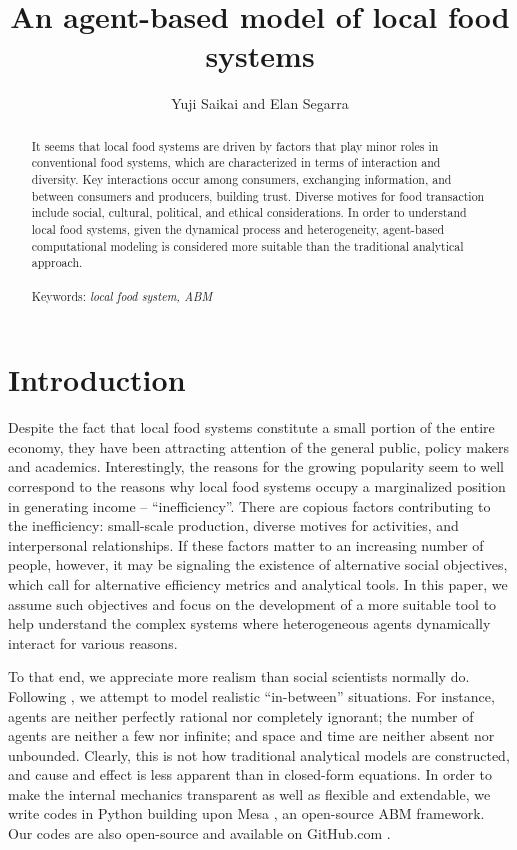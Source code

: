 \documentclass[11pt, oneside]{article}
\title{An agent-based model of local food systems}
\author{Yuji Saikai and Elan Segarra}
\begin{document}
\maketitle
\thispagestyle{empty} %
\vspace{5mm}

\begin{abstract}
\noindent 
It seems that local food systems are driven by factors that play minor roles in conventional food systems, which are characterized in terms of interaction and diversity. Key interactions occur among consumers, exchanging information, and between consumers and producers, building trust. Diverse motives for food transaction include social, cultural, political, and ethical considerations. In order to understand local food systems, given the dynamical process and heterogeneity, agent-based computational modeling is considered more suitable than the traditional analytical approach.\\\\
\noindent
Keywords: \textit{local food system, ABM}
\end{abstract}

\pagebreak

\tableofcontents
\pagebreak

\section{Introduction}
Despite the fact that local food systems constitute a small portion of the entire economy, they have been attracting  attention of the general public, policy makers and academics. Interestingly, the reasons for the growing popularity seem to well correspond to the reasons why local food systems occupy a marginalized position in generating income -- ``inefficiency''. There are copious factors contributing to the inefficiency: small-scale production, diverse motives for activities, and interpersonal relationships. If these factors matter to an increasing number of people, however, it may be signaling the existence of alternative social objectives, which call for alternative efficiency metrics and analytical tools. In this paper, we assume such objectives and focus on the development of a more suitable tool to help understand the complex systems where heterogeneous agents dynamically interact for various reasons.

To that end, we appreciate more realism than social scientists normally do. Following \textcite{Miller2009}, we attempt to model realistic ``in-between'' situations. For instance, agents are neither perfectly rational nor completely ignorant; the number of agents are neither a few nor infinite; and space and time are neither absent nor unbounded. Clearly, this is not how traditional analytical models are constructed, and cause and effect is less apparent than in closed-form equations. In order to make the internal mechanics transparent as well as flexible and extendable, we write codes in Python building upon Mesa \parencite{Mesa2016}, an open-source ABM framework. Our codes are also open-source and available on GitHub.com \parencite{Saikai2016}.
\end{document}
